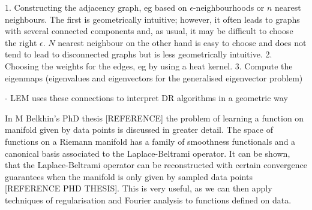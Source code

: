\documentclass[journal, a4paper]{IEEEtran}
\begin{document}
1. Constructing the adjacency graph, eg based on \( \epsilon \)-neighbourhoods or \( n \) nearest neighbours.
The first is geometrically intuitive; however, it often leads to graphs with several connected components and, as usual, it may be difficult to choose the right \( \epsilon \). \( N \) nearest neighbour on the other hand is easy to choose and does not tend to lead to disconnected graphs but is less geometrically intuitive.
2. Choosing the weights for the edges, eg by using a heat kernel.
3. Compute the eigenmaps (eigenvalues and eigenvectors for the generalised eigenvector problem)

- LEM uses these connections to interpret DR algorithms in a geometric way %



In M Belkhin's PhD thesis [REFERENCE] the problem of learning a function on manifold given by data points is discussed in greater detail. The space of functions on a Riemann manifold has a family of smoothness functionals and a canonical basis associated to the Laplace-Beltrami operator. It can be shown, that the Laplace-Beltrami operator can be reconstructed with certain convergence guarantees when the manifold is only given by sampled data points [REFERENCE PHD THESIS]. This is very useful, as we can then apply techniques of regularisation and Fourier analysis to functions defined on data. 
 
 
\end{document}
